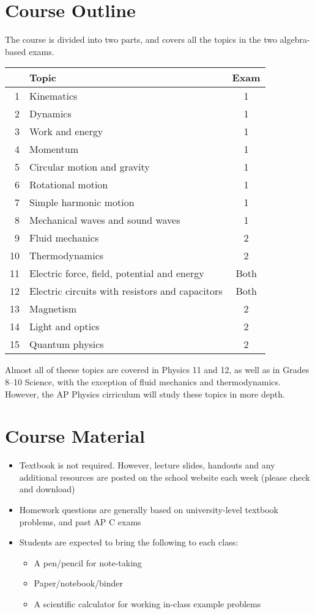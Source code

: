 \documentclass{../../oss-handout}
\begin{document}
\section*{Course Outline}
The course is divided into two parts, and covers all the topics in the two
algebra-based exams.
\begin{center}
  \begin{tabular}{rl|c}
    & \textbf{Topic} & \textbf{Exam}\\
    \hline
    1 & Kinematics & 1 \\
    2 & Dynamics   & 1 \\
    3 & Work and energy & 1 \\
    4 & Momentum   & 1 \\
    5 & Circular motion and gravity & 1 \\
    6 & Rotational motion & 1 \\
    7 & Simple harmonic motion & 1 \\
    8 & Mechanical waves and sound waves & 1 \\
    9 & Fluid mechanics & 2 \\
    10 & Thermodynamics & 2 \\
    11 & Electric force, field, potential and energy & Both \\
    12 & Electric circuits with resistors and capacitors & Both \\
    13 & Magnetism & 2 \\
    14 & Light and optics & 2 \\
    15 & Quantum physics & 2
  \end{tabular}
\end{center}
Almost all of theese topics are covered in Physics 11 and 12, as well as in
Grades 8--10 Science, with the exception of fluid mechanics and thermodynamics.
However, the AP Physics cirriculum will study these topics in more depth.

\section*{Course Material}
\begin{itemize}[nosep]
\item Textbook is not required. However, lecture slides, handouts and any
  additional resources are posted on the school website each week (please check
  and download)
\item Homework questions are generally based on university-level textbook
  problems, and past AP C exams
\item Students are expected to bring the following to each class:
  \begin{itemize}[noitemsep,topsep=0pt]
  \item A pen/pencil for note-taking
  \item Paper/notebook/binder
  \item A scientific calculator for working in-class example problems
  \end{itemize}
\end{itemize}
\end{document}
